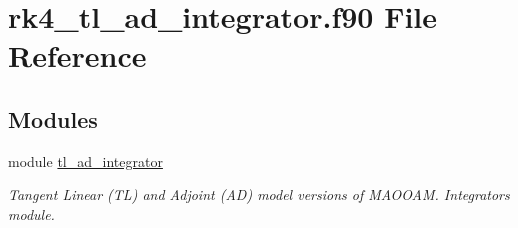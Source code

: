 \hypertarget{rk4__tl__ad__integrator_8f90}{}\section{rk4\+\_\+tl\+\_\+ad\+\_\+integrator.\+f90 File Reference}
\label{rk4__tl__ad__integrator_8f90}
\subsection*{Modules}
\begin{DoxyCompactItemize}
\item 
module \hyperlink{namespacetl__ad__integrator}{tl\+\_\+ad\+\_\+integrator}
\begin{DoxyCompactList}\small\item\em Tangent Linear (TL) and Adjoint (AD) model versions of M\+A\+O\+O\+AM. Integrators module. \end{DoxyCompactList}\end{DoxyCompactItemize}
